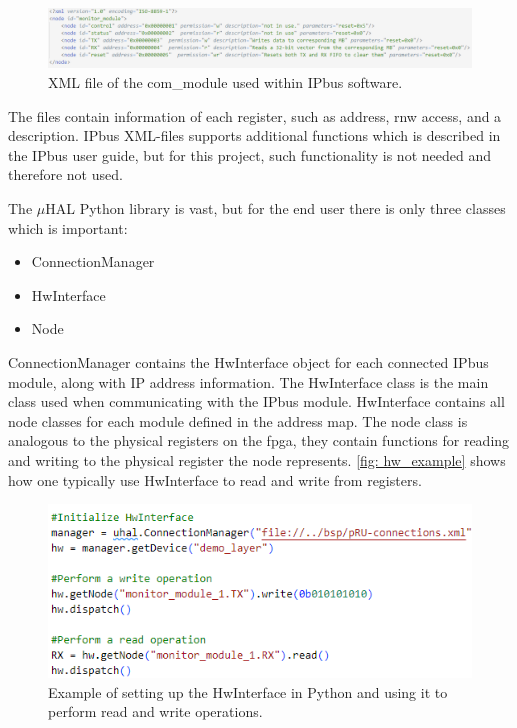 \documentclass[main.tex]{subfiles}
\begin{document}
\begin{figure}[!htpb]
    \centering
    \includegraphics[scale=0.65]{images/com_module_xml.png}
    \caption{XML file of the com\_module used within IPbus software.}
    \label{fig: xml_example}
\end{figure}
\FloatBarrier

The files contain information of each register, such as address, \gls{rnw} access, and a description. IPbus XML-files supports additional functions which is described in the IPbus user guide\cite{ipbus_guide}, but for this project, such functionality is not needed and therefore not used.

The $\mu$HAL Python library is vast, but for the end user there is only three classes which is important:

\begin{itemize}
    \item ConnectionManager
    \item HwInterface
    \item Node
\end{itemize}

ConnectionManager contains the HwInterface object for each connected IPbus module, along with IP address information. The HwInterface class is the main class used when communicating with the IPbus module. HwInterface contains all node classes for each module defined in the address map. The node class is analogous to the physical registers on the \gls{fpga}, they contain functions for reading and writing to the physical register the node represents. \autoref{fig: hw_example} shows how one typically use HwInterface to read and write from registers.

\begin{figure}[!htpb]
    \centering
    \includegraphics[scale=0.8]{images/HwInterface_example.png}
    \caption{Example of setting up the HwInterface in Python and using it to perform read and write operations.}
    \label{fig: hw_example}
\end{figure}
\FloatBarrier
\end{document}
